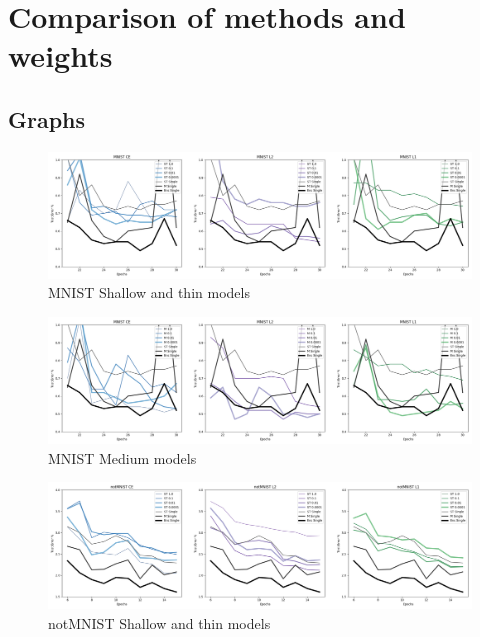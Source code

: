 \documentclass[english,a4paper,oneside]{amsart}
\theoremstyle{definition}
\begin{document}


\newpage
\appendix
\section{Comparison of methods and weights}
\subsection{Graphs}
\begin{figure}[H]
	\begin{center} \includegraphics[scale=0.3]{graphs/MNIST_ST_TestError.png}\end{center}
	\caption{MNIST Shallow and thin models}\label{STMNISTFig}
\end{figure}
\begin{figure}[H]
	\begin{center} \includegraphics[scale=0.3]{graphs/MNIST_M_TestError.png}\end{center}
	\caption{MNIST Medium models}\label{MMNISTFig}
\end{figure}
\begin{figure}[H]
	\begin{center} \includegraphics[scale=0.3]{graphs/notMNIST_ST_TestError.png}\end{center}
	\caption{notMNIST Shallow and thin models}\label{STnotMNISTFig}
\end{figure}
\end{document}
